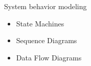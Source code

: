 \begin{Slide}{System behavior modeling}

\begin{itemize}
\item State Machines

\item Sequence Diagrams

\item Data Flow Diagrams


\end{itemize}
\end{Slide}